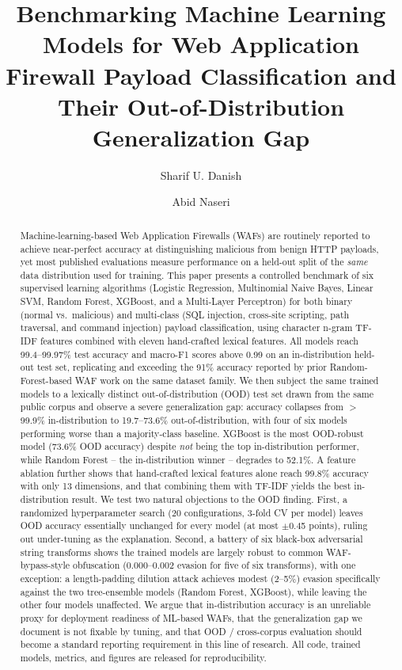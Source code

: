 \documentclass[sigconf]{acmart}
\begin{document}
\title{Benchmarking Machine Learning Models for Web Application Firewall Payload Classification and Their Out-of-Distribution Generalization Gap}

\author{Sharif U. Danish}

\author{Abid Naseri}

\begin{abstract}
Machine-learning-based Web Application Firewalls (WAFs) are routinely reported
to achieve near-perfect accuracy at distinguishing malicious from benign HTTP
payloads, yet most published evaluations measure performance on a held-out
split of the \emph{same} data distribution used for training. This paper
presents a controlled benchmark of six supervised learning algorithms
(Logistic Regression, Multinomial Naive Bayes, Linear SVM, Random Forest,
XGBoost, and a Multi-Layer Perceptron) for both binary (normal vs.\ malicious)
and multi-class (SQL injection, cross-site scripting, path traversal, and
command injection) payload classification, using character n-gram TF-IDF
features combined with eleven hand-crafted lexical features. All models reach
99.4--99.97\% test accuracy and macro-F1 scores above 0.99 on an
in-distribution held-out test set, replicating and exceeding the 91\% accuracy
reported by prior Random-Forest-based WAF work on the same dataset family. We
then subject the same trained models to a lexically distinct out-of-distribution
(OOD) test set drawn from the same public corpus and observe a severe
generalization gap: accuracy collapses from $>$99.9\% in-distribution to
19.7--73.6\% out-of-distribution, with four of six models performing worse
than a majority-class baseline. XGBoost is the most OOD-robust model
(73.6\% OOD accuracy) despite \emph{not} being the top in-distribution
performer, while Random Forest -- the in-distribution winner -- degrades to
52.1\%. A feature ablation further shows that hand-crafted lexical features
alone reach 99.8\% accuracy with only 13 dimensions, and that combining them
with TF-IDF yields the best in-distribution result. We test two natural
objections to the OOD finding. First, a randomized hyperparameter search
(20 configurations, 3-fold CV per model) leaves OOD accuracy essentially
unchanged for every model (at most $\pm$0.45 points), ruling out
under-tuning as the explanation. Second, a battery of six black-box
adversarial string transforms shows the trained models are largely robust
to common WAF-bypass-style obfuscation (0.000--0.002 evasion for five of
six transforms), with one exception: a length-padding dilution attack
achieves modest (2--5\%) evasion specifically against the two
tree-ensemble models (Random Forest, XGBoost), while leaving the other four
models unaffected. We argue that in-distribution accuracy is an unreliable
proxy for deployment readiness of ML-based WAFs, that the generalization
gap we document is not fixable by tuning, and that OOD / cross-corpus
evaluation should become a standard reporting requirement in this line of
research. All code, trained models, metrics, and figures are released for
reproducibility.
\end{abstract}
\end{document}
